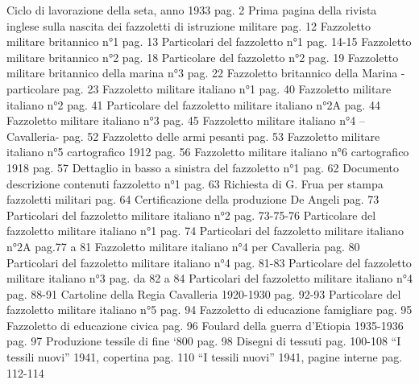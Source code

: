 Ciclo di lavorazione della seta, anno 1933  	          pag.   2
Prima pagina della rivista inglese sulla 
nascita dei fazzoletti di istruzione militare   	          pag. 12                              
Fazzoletto militare britannico n°1		                     pag.  13
Particolari del fazzoletto n°1   		                pag. 14-15
Fazzoletto militare britannico n°2 		                     pag.  18
Particolare del fazzoletto n°2  		                     pag.  19
Fazzoletto militare britannico della marina n°3           pag. 22
Fazzoletto britannico della Marina -particolare 	          pag. 23
Fazzoletto militare italiano n°1                                    pag.   40
Fazzoletto militare italiano n°2                                     pag.  41
Particolare del fazzoletto militare italiano n°2A         pag.  44
Fazzoletto militare italiano n°3                                     pag.  45      
Fazzoletto militare italiano n°4 –Cavalleria-     	          pag. 52
Fazzoletto delle armi pesanti                   		          pag. 53
Fazzoletto militare italiano n°5 cartografico 1912       pag. 56
Fazzoletto militare italiano n°6 cartografico 1918       pag. 57
Dettaglio in basso a sinistra del fazzoletto n°1              pag. 62
Documento descrizione contenuti fazzoletto n°1          pag. 63
Richiesta di G. Frua per stampa fazzoletti militari      pag. 64
Certificazione della produzione De Angeli                     pag. 73
Particolari del fazzoletto militare italiano n°2   pag. 73-75-76
Particolare del fazzoletto militare italiano n°1            pag.  74
Particolari del fazzoletto militare italiano n°2A    pag.77 a 81
Fazzoletto militare italiano n°4 per Cavalleria             pag. 80
Particolari del fazzoletto militare italiano n°4           pag. 81-83          
Particolare del fazzoletto militare italiano n°3   pag. da 82 a 84     
Particolari del fazzoletto militare italiano n°4         pag. 88-91        
Cartoline della Regia Cavalleria 1920-1930              pag. 92-93
Particolare del fazzoletto militare italiano n°5            pag.  94    
Fazzoletto di educazione famigliare                              pag.  95
Fazzoletto di educazione civica                                     pag.  96
Foulard  della guerra d’Etiopia 1935-1936                   pag.  97
Produzione tessile di fine ‘800                                        pag.  98
Disegni di tessuti                                                     pag. 100-108
“I tessili nuovi” 1941, copertina                                   pag. 110
“I tessili nuovi” 1941, pagine interne                     pag. 112-114
